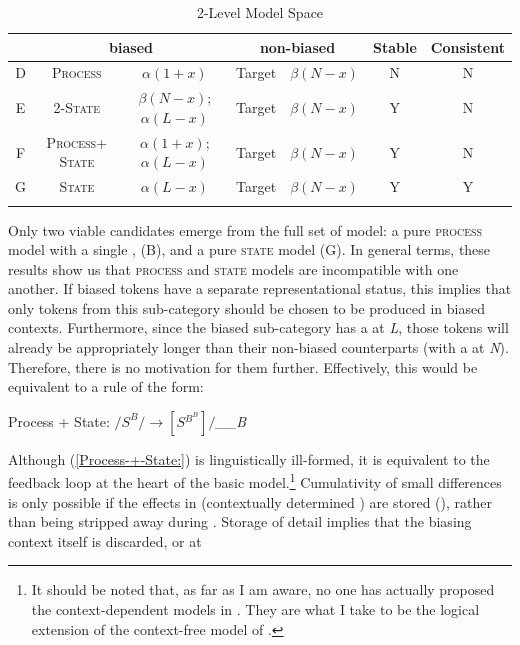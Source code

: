 \begin{table}[h]\footnotesize
\caption{2-Level Model Space\label{tab: Model Comparison}}
\begin{tabular}{ccccccc}
\lsptoprule
 & \multicolumn{2}{c}{biased} & \multicolumn{2}{c}{non-biased} & Stable & Consistent\tabularnewline\midrule
D & \textsc{Process} & $\alpha(1+x)$ & Target & $\beta(N-x)$ & N & N\tabularnewline
E & \textsc{2-State} & $\beta(N-x)$; $\alpha(L-x)$ & Target & $\beta(N-x)$ & Y & N\tabularnewline
F & \textsc{Process+ State} & $\alpha(1+x)$; $\alpha(L-x)$ & Target & $\beta(N-x)$ & Y & N\tabularnewline
G & \textsc{State} & $\alpha(L-x)$ & Target & $\beta(N-x)$ & Y & Y\tabularnewline
\lspbottomrule
\end{tabular}
\end{table}

Only two viable candidates emerge from the full set of model: a pure
\textsc{process} model with a single , (B), and a pure \textsc{state}
model (G). In general terms, these results show us that \textsc{process}
and \textsc{state} models are incompatible with one another. If biased
tokens have a separate representational status, this implies that
only tokens from this sub-category should be chosen to be produced
in biased contexts. Furthermore, since the biased sub-category has
a  at \emph{L}, those tokens will already be appropriately longer
than their non-biased counterparts (with a  at \emph{N}). Therefore,
there is no motivation for  them further. Effectively,
this would be equivalent to a  rule of the form:
\begin{covexamples}
\item \label{Process-+-State:}Process + State: $/S^{B}/\rightarrow[S{}^{B^{B}}]/$\emph{\_\_B}
\end{covexamples}
Although (\ref{Process-+-State:}) is linguistically ill-formed, it
is equivalent to the feedback loop at the heart of the basic 
model.\footnote{It should be noted that, as far as I am aware, no one has actually
proposed the context-dependent  models in .
They are what I take to be the logical extension of the context-free
 model of \citet{Pierrehumbert2000}.} Cumulativity of small differences is only possible if the  effects
in  (contextually determined ) are stored (),
rather than being stripped away during . Storage of 
detail implies that the biasing context itself is discarded, or at
